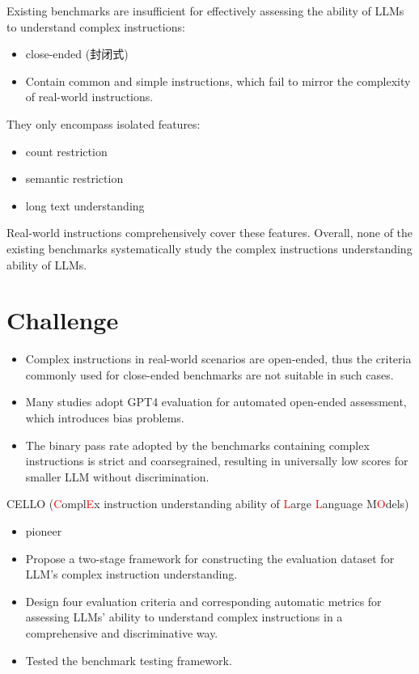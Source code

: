 \documentclass{beamer}
\begin{document}
\begin{frame}
    Existing benchmarks are insufficient for effectively assessing the ability of LLMs to understand complex instructions:
    \begin{itemize}
        \item {close-ended (封闭式)}
        \item {Contain common and simple instructions, which fail to mirror the complexity of real-world instructions.}
    \end{itemize}
    They only encompass isolated features:
    \begin{itemize}
        \item {count restriction}
        \item {semantic restriction}
        \item {long text understanding}
    \end{itemize}
    Real-world instructions comprehensively cover these features. Overall, none of the existing benchmarks systematically study the complex instructions understanding ability of LLMs.
\end{frame}

\section{Challenge}

\begin{frame}
    \begin{itemize}
        \item {Complex instructions in real-world scenarios are open-ended, thus the criteria commonly used for close-ended benchmarks are not suitable in such cases.}
        \item {Many studies adopt GPT4 evaluation for automated open-ended assessment, which introduces bias problems.}
        \item {The binary pass rate adopted by the benchmarks containing complex instructions is strict and coarsegrained, resulting in universally low scores for smaller LLM without discrimination.}
    \end{itemize}
\end{frame}

\begin{frame}{CELLO (\textcolor{red}{C}ompl\textcolor{red}{E}x instruction understanding ability of \textcolor{red}{L}arge \textcolor{red}{L}anguage M\textcolor{red}{O}dels)}
    \begin{itemize}
        \item {pioneer}
        \item {Propose a two-stage framework for constructing the evaluation dataset for LLM's complex instruction understanding.}
        \item {Design four evaluation criteria and corresponding automatic metrics for assessing LLMs' ability to understand complex instructions in a comprehensive and discriminative way.}
        \item {Tested the benchmark testing framework.}
    \end{itemize}
\end{frame}
\end{document}

